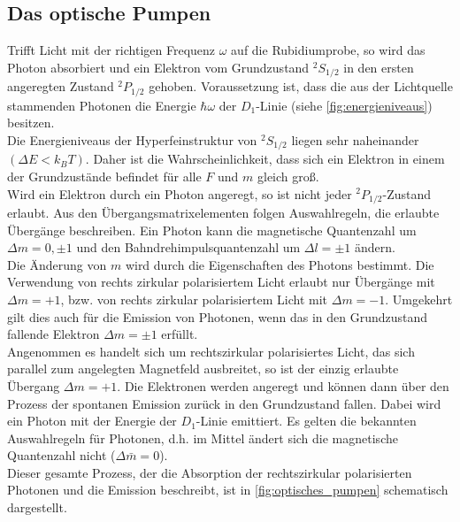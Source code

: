 \subsection{Das optische Pumpen}
\label{sec:optisches_pumpen}
Trifft Licht mit der richtigen Frequenz $\omega$ auf die Rubidiumprobe, so wird das Photon absorbiert und ein Elektron vom Grundzustand $^2S_{1/2}$ in den ersten angeregten Zustand $^2P_{1/2}$ gehoben.
Voraussetzung ist, dass die aus der Lichtquelle stammenden Photonen die Energie $\hbar \omega$ der $D_1$-Linie (siehe \autoref{fig:energieniveaus}) besitzen.
\\
Die Energieniveaus der Hyperfeinstruktur von $^2S_{1/2}$ liegen sehr naheinander $(\Delta E < k_B T)$.
Daher ist die Wahrscheinlichkeit, dass sich ein Elektron in einem der Grundzustände befindet für alle $F$ und $m$ gleich groß.
\\
Wird ein Elektron durch ein Photon angeregt, so ist nicht jeder $^2P_{1/2}$-Zustand erlaubt.
Aus den Übergangsmatrixelementen folgen Auswahlregeln, die erlaubte Übergänge beschreiben.
Ein Photon kann die magnetische Quantenzahl um $\Delta m = 0, \pm 1$ und den Bahndrehimpulsquantenzahl um $\Delta l = \pm 1$ ändern.
\\
Die Änderung von $m$ wird durch die Eigenschaften des Photons bestimmt.
Die Verwendung von rechts zirkular polarisiertem Licht erlaubt nur Übergänge mit $\Delta m = +1$, bzw. von rechts zirkular polarisiertem Licht mit $\Delta m = -1$.
Umgekehrt gilt dies auch für die Emission von Photonen, wenn das in den Grundzustand fallende Elektron $\Delta m = \pm 1$ erfüllt.
\\
Angenommen es handelt sich um rechtszirkular polarisiertes Licht, das sich parallel zum angelegten Magnetfeld ausbreitet, so ist der einzig erlaubte Übergang $\Delta m = +1$.
Die Elektronen werden angeregt und können dann über den Prozess der spontanen Emission zurück in den Grundzustand fallen.
Dabei wird ein Photon mit der Energie der $D_1$-Linie emittiert.
Es gelten die bekannten Auswahlregeln für Photonen, d.h. im Mittel ändert sich die magnetische Quantenzahl nicht ($\Delta \bar{m} = 0$).
\\
Dieser gesamte Prozess, der die Absorption der rechtszirkular polarisierten Photonen und die Emission beschreibt, ist in \autoref{fig:optisches_pumpen} schematisch dargestellt.
